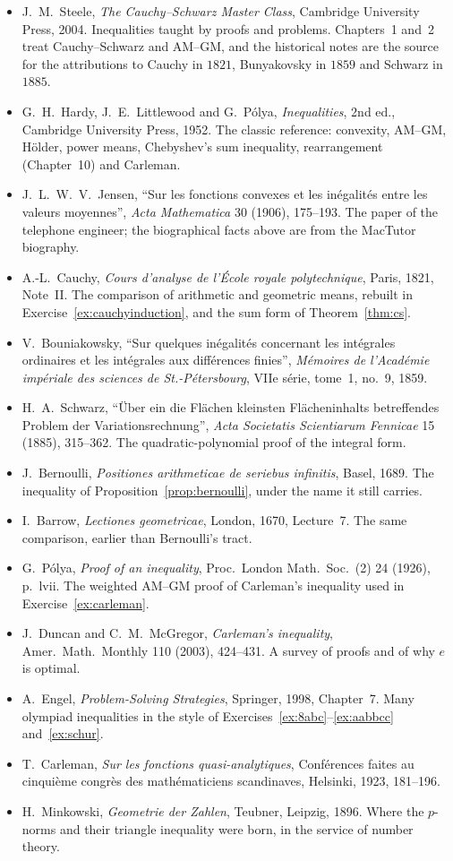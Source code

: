 \begin{itemize}\raggedright
\item J.~M.~Steele, \emph{The Cauchy--Schwarz Master Class}, Cambridge University Press, 2004. Inequalities taught by proofs and problems. Chapters~1 and~2 treat Cauchy--Schwarz and AM--GM, and the historical notes are the source for the attributions to Cauchy in $1821$, Bunyakovsky in $1859$ and Schwarz in $1885$.
\item G.~H.~Hardy, J.~E.~Littlewood and G.~P\'olya, \emph{Inequalities}, 2nd ed., Cambridge University Press, 1952. The classic reference: convexity, AM--GM, H\"older, power means, Chebyshev's sum inequality, rearrangement (Chapter~10) and Carleman.
\item J.~L.~W.~V.~Jensen, ``Sur les fonctions convexes et les in\'egalit\'es entre les valeurs moyennes'', \emph{Acta Mathematica} 30 (1906), 175--193. The paper of the telephone engineer; the biographical facts above are from the MacTutor biography.
\item A.-L.~Cauchy, \emph{Cours d'analyse de l'\'Ecole royale polytechnique}, Paris, 1821, Note~II. The comparison of arithmetic and geometric means, rebuilt in Exercise~\ref{ex:cauchyinduction}, and the sum form of Theorem~\ref{thm:cs}.
\item V.~Bouniakowsky, ``Sur quelques in\'egalit\'es concernant les int\'egrales ordinaires et les int\'egrales aux diff\'erences finies'', \emph{M\'emoires de l'Acad\'emie imp\'eriale des sciences de St.-P\'etersbourg}, VIIe s\'erie, tome~1, no.~9, 1859.
\item H.~A.~Schwarz, ``\"Uber ein die Fl\"achen kleinsten Fl\"acheninhalts betreffendes Problem der Variationsrechnung'', \emph{Acta Societatis Scientiarum Fennicae} 15 (1885), 315--362. The quadratic-polynomial proof of the integral form.
\item J.~Bernoulli, \emph{Positiones arithmeticae de seriebus infinitis}, Basel, 1689. The inequality of Proposition~\ref{prop:bernoulli}, under the name it still carries.
\item I.~Barrow, \emph{Lectiones geometricae}, London, 1670, Lecture~7. The same comparison, earlier than Bernoulli's tract.
\item G.~P\'olya, \emph{Proof of an inequality}, Proc.\ London Math.\ Soc.\ (2) 24 (1926), p.~lvii. The weighted AM--GM proof of Carleman's inequality used in Exercise~\ref{ex:carleman}.
\item J.~Duncan and C.~M.~McGregor, \emph{Carleman's inequality}, Amer.\ Math.\ Monthly 110 (2003), 424--431. A survey of proofs and of why $e$ is optimal.
\item A.~Engel, \emph{Problem-Solving Strategies}, Springer, 1998, Chapter~7. Many olympiad inequalities in the style of Exercises~\ref{ex:8abc}--\ref{ex:aabbcc} and~\ref{ex:schur}.
\item T.~Carleman, \emph{Sur les fonctions quasi-analytiques}, Conf\'erences faites au cinqui\`eme congr\`es des math\'ematiciens scandinaves, Helsinki, 1923, 181--196.
\item H.~Minkowski, \emph{Geometrie der Zahlen}, Teubner, Leipzig, 1896. Where the $p$-norms and their triangle inequality were born, in the service of number theory.
\end{itemize}
